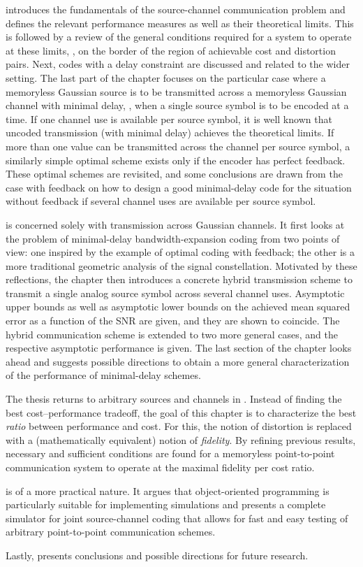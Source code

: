  introduces the fundamentals of the source-channel
communication problem and defines the relevant performance measures as well as
their theoretical limits.  This is followed by a review of the general
conditions required for a system to operate at these limits, \ie, on the border
of the region of achievable cost and distortion pairs. Next, codes with a delay
constraint are discussed and related to the wider setting. The last part of the
chapter focuses on the particular case where a memoryless Gaussian source is to
be transmitted across a memoryless Gaussian channel with minimal delay, \ie,
when a single source symbol is to be encoded at a time. If one channel use is
available per source symbol, it is well known that uncoded transmission (with
minimal delay) achieves the theoretical limits. If more than one value can be
transmitted across the channel per source symbol, a similarly simple optimal
scheme exists only if the encoder has perfect feedback. These optimal schemes
are revisited, and some conclusions are drawn from the case with feedback on how
to design a good minimal-delay code for the situation without feedback if
several channel uses are available per source symbol.

 is concerned solely with transmission across Gaussian
channels. It first looks at the problem of minimal-delay bandwidth-expansion
coding from two points of view: one inspired by the example of optimal coding
with feedback; the other is a more traditional geometric analysis of the signal
constellation. Motivated by these reflections, the chapter then introduces a
concrete hybrid transmission scheme to transmit a single analog source symbol
across several channel uses.  Asymptotic upper bounds as well as asymptotic
lower bounds on the achieved mean squared error as a function of the SNR are
given, and they are shown to coincide. The hybrid communication scheme is
extended to two more general cases, and the respective asymptotic performance is
given. The last section of the chapter looks ahead and suggests possible
directions to obtain a more general characterization of the performance of
minimal-delay schemes. 

The thesis returns to arbitrary sources and channels in .
Instead of finding the best cost--performance tradeoff, the goal of this chapter
is to characterize the best \emph{ratio} between performance and cost. For this,
the notion of distortion is replaced with a (mathematically equivalent) notion
of \emph{fidelity}. By refining previous results, necessary and sufficient
conditions are found for a memoryless point-to-point communication system to
operate at the maximal fidelity per cost ratio. 

 is of a more practical nature. It argues that
object-oriented programming is particularly suitable for implementing
simulations and presents a complete simulator for joint source-channel coding
that allows for fast and easy testing of arbitrary point-to-point communication
schemes. 

Lastly,  presents conclusions and possible directions for
future research.

